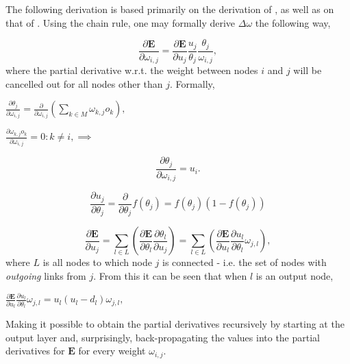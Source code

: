 The following derivation is based primarily on the derivation of \cite{Rumelhart1986}, as well as on that of \cite{Russell2009}.
Using the chain rule, one may formally derive $\Delta \omega$ the following way,

\begin{equation}
    \frac{\partial \textbf{E}}{\partial \omega_{i,j}} = \frac{\partial \textbf{E}}{\partial u_j}
    \frac{u_j}{\theta_{j}}
    \frac{\theta_{j}}{\omega_{i,j}},
\end{equation}
where the partial derivative w.r.t. the weight between nodes $i$ and $j$ will be cancelled out for all nodes other than $j$. Formally,

\begin{center}
\begin{math}
    \frac{\partial \theta_j}{\partial \omega_{i,j}} = \frac{\partial}{\partial \omega_{i,j}}(\sum_{k \in M}{} \omega_{k,j}o_k),
\end{math}
\end{center}

\begin{center}
\begin{math}
    \frac{\partial \omega_{k,j}o_k}{\partial \omega_{i,j}} = 0 : k \neq i,
    \implies
\end{math}
\end{center}
\begin{equation}
    \frac{\partial \theta_j}{\partial \omega_{i,j}} = u_i.
\end{equation}

\begin{equation}
    \frac{\partial u_j}{\partial \theta_j} = \frac{\partial}{\partial \theta_j} f(\theta_j) = f(\theta_j)(1-f(\theta_j))
\end{equation}

\begin{equation}
    \frac{\partial \textbf{E}}{\partial u_j} = \sum_{l \in L}(\frac{\partial \textbf{E}}{\partial \theta_l} 
    \frac{\partial \theta_l}{\partial u_j})
    = \sum_{l \in L}(\frac{\partial \textbf{E}}{\partial u_l} \frac{\partial u_l}{\partial \theta_l} \omega_{j,l}),
\end{equation}
where $L$ is all nodes to which node $j$ is connected - i.e. the set of nodes with \textit{outgoing} links from $j$. From this it can be seen that when $l$ is an output node,

\begin{center}
\begin{math}
    \frac{\partial \textbf{E}}{\partial u_l} \frac{\partial u_l}{\partial \theta_l} \omega_{j,l} = 
    u_l (u_l - d_l) \omega_{j,l},
\end{math}
\end{center}
Making it possible to obtain the partial derivatives recursively by starting at the output layer and, surprisingly, back-propagating the values into the partial derivatives for $\textbf{E}$ for every weight $\omega_{i,j}$.

